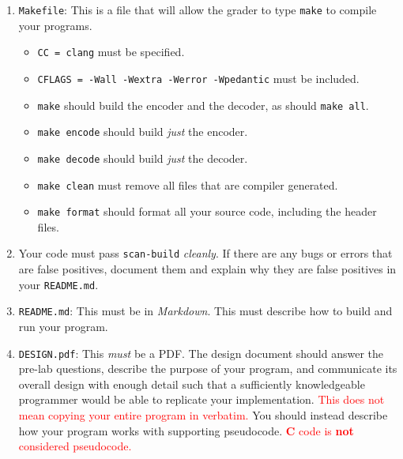 \begin{enumerate}

  \item \texttt{Makefile}: This is a file that will allow the grader to
    type \texttt{make} to compile your programs.

    \begin{itemize}
      \item \texttt{CC = clang} must be specified.

      \item \texttt{CFLAGS = -Wall -Wextra -Werror -Wpedantic}
        must be included.

      \item \texttt{make} should build the encoder and the decoder, as
        should \texttt{make all}.

      \item \texttt{make encode} should build \emph{just} the encoder.

      \item \texttt{make decode} should build \emph{just} the decoder.

      \item \texttt{make clean} must remove all files that are compiler
        generated.

      \item \texttt{make format} should format all your source code,
        including the header files.
    \end{itemize}

  \item Your code must pass \texttt{scan-build} \emph{cleanly}. If there
    are any bugs or errors that are false positives, document them and
    explain why they are false positives in your \texttt{README.md}.

  \item \texttt{README.md}: This must be in \emph{Markdown}. This must describe
    how to build and run your program.

  \item \texttt{DESIGN.pdf}: This \emph{must} be a PDF\@. The design document
    should answer the pre-lab questions, describe the purpose of your program,
    and communicate its overall design with enough detail such that a sufficiently
    knowledgeable programmer would be able to replicate your implementation.
    \textcolor{red}{This does not mean copying your entire program in verbatim.}
    You should instead describe how your program works with supporting pseudocode.
    \textcolor{red}{\textbf{C} code is \textbf{not} considered pseudocode.}
\end{enumerate}
